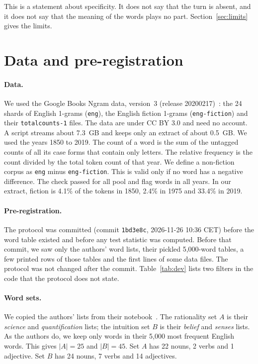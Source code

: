 \documentclass[11pt]{article}
\begin{document}
This is a statement about specificity. It does not say that the turn is absent, and it does not say that the meaning of the words plays no part. Section~\ref{sec:limits} gives the limits.

\section{Data and pre-registration}
\paragraph{Data.} We used the Google Books Ngram data, version~3 (release 20200217)~\cite{ngram}: the 24 shards of English 1-grams (\texttt{eng}), the English fiction 1-grams (\texttt{eng-fiction}) and their \texttt{totalcounts-1} files. The data are under CC BY 3.0 and need no account. A script streams about 7.3~GB and keeps only an extract of about 0.5~GB. We used the years 1850 to 2019. The count of a word is the sum of the untagged counts of all its case forms that contain only letters. The relative frequency is the count divided by the total token count of that year. We define a non-fiction corpus as \texttt{eng} minus \texttt{eng-fiction}. This is valid only if no word has a negative difference. The check passed for all pool and flag words in all years. In our extract, fiction is 4.1\% of the tokens in 1850, 2.4\% in 1975 and 33.4\% in 2019.

\paragraph{Pre-registration.} The protocol was committed (commit \texttt{1bd3e8c}, 2026-11-26 10:36 CET) before the word table existed and before any test statistic was computed. Before that commit, we saw only the authors' word lists, their pickled 5,000-word tables, a few printed rows of those tables and the first lines of some data files. The protocol was not changed after the commit. Table~\ref{tab:dev} lists two filters in the code that the protocol does not state.

\paragraph{Word sets.} We copied the authors' lists from their notebook~\cite{scheffercode}. The rationality set $A$ is their \emph{science} and \emph{quantification} lists; the intuition set $B$ is their \emph{belief} and \emph{senses} lists. As the authors do, we keep only words in their 5,000 most frequent English words. This gives $|A| = 25$ and $|B| = 45$. Set $A$ has 22 nouns, 2 verbs and 1 adjective. Set $B$ has 24 nouns, 7 verbs and 14 adjectives.
\end{document}
